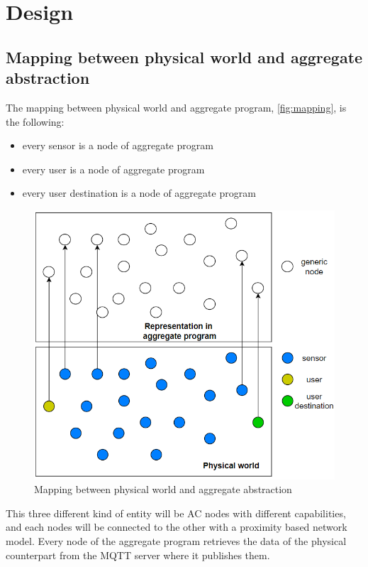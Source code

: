 \chapter{Design}

\section{Mapping between physical world and aggregate abstraction}

The mapping between physical world and aggregate program, \autoref{fig:mapping}, is the following:
\begin{itemize}
    \item every sensor is a node of aggregate program
    \item every user is a node of aggregate program
    \item every user destination is a node of aggregate program
\end{itemize}

\begin{figure}[h]
    \centering
    \includegraphics{images/mapping_physicalWorld_ac.png}
    \caption{Mapping between physical world and aggregate abstraction}
    \label{fig:mapping}
\end{figure}
This three different kind of entity will be AC nodes with different capabilities, and each nodes will be connected to the other with a proximity based network model. 
Every node of the aggregate program retrieves the data of the physical counterpart from the MQTT server where it publishes them.

